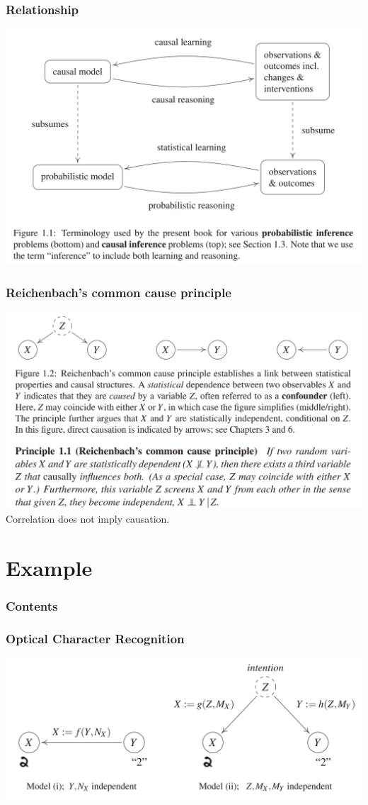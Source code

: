 \documentclass{beamer}
\begin{document}
\begin{frame}
    \frametitle{Relationship}
    \includegraphics[scale=0.6]{fig3.png}
\end{frame}

\begin{frame}
    \frametitle{Reichenbach's common cause principle}
    \includegraphics[scale=0.6]{fig1.png}
    Correlation does not imply causation.
\end{frame}

\section{Example}

\begin{frame}
    \frametitle{Contents}
    \tableofcontents[currentsection]
\end{frame}

\begin{frame}
    \frametitle{Optical Character Recognition}
    \includegraphics[scale=0.6]{fig2.png}
\end{frame}
\end{document}
